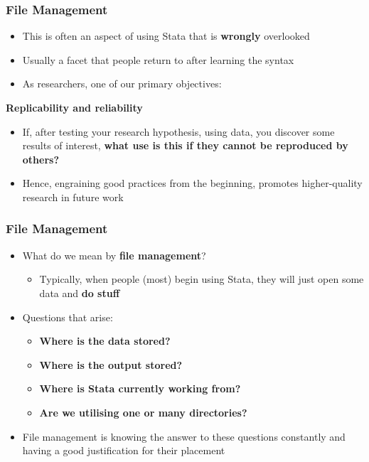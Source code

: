 \documentclass[10pt, compress]{beamer}
\begin{document}
\begin{frame}[fragile]
\frametitle{File Management}
\begin{itemize}
\item This is often an aspect of using Stata that is \textbf{wrongly} overlooked
\item Usually a facet that people return to after learning the syntax
\item As researchers, \alert{one of our primary objectives}:
\end{itemize}
\begin{center}
	\textbf{Replicability and reliability}
\end{center}
\begin{itemize}
\item If, after testing your research hypothesis, using data, you discover some results of interest, \textbf{what use is this if they cannot be reproduced by others?}
\item Hence, engraining good practices from the beginning, \alert{promotes higher-quality research} in future work
\end{itemize}
\end{frame}

\begin{frame}[fragile]
\frametitle{File Management}
\begin{itemize}
\item What do we mean by \textbf{file management}?
\begin{itemize}
\item Typically, when people (\alert{most}) begin using Stata, they will just open some data and \textbf{do stuff}
\end{itemize}
\item Questions that arise:
\begin{itemize}
\item \textbf{Where is the data stored?}
\item \textbf{Where is the output stored?}
\item \textbf{Where is Stata currently working from?}
\item \textbf{Are we utilising one or many directories?}
\end{itemize}
\item File management is knowing the answer to these questions constantly and having a good justification for their placement
\end{itemize}
\end{frame}
\end{document}
